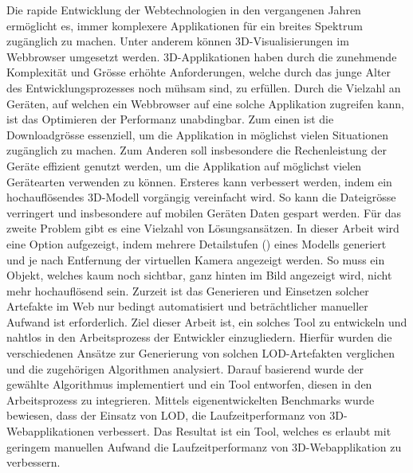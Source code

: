 Die rapide Entwicklung der Webtechnologien in den vergangenen Jahren ermöglicht es, immer komplexere Applikationen für ein breites Spektrum zugänglich zu machen. Unter anderem können 3D-Visualisierungen im Webbrowser umgesetzt werden.
3D-Applikationen haben durch die zunehmende Komplexität und Grösse erhöhte Anforderungen, welche durch das junge Alter des Entwicklungsprozesses noch mühsam sind, zu erfüllen.
Durch die Vielzahl an Geräten, auf welchen ein Webbrowser auf eine solche Applikation zugreifen kann, ist das Optimieren der Performanz unabdingbar.
Zum einen ist die Downloadgrösse essenziell, um die Applikation in möglichst vielen Situationen zugänglich zu machen. Zum Anderen soll insbesondere die Rechenleistung der Geräte effizient genutzt werden, um die Applikation auf möglichst vielen Gerätearten verwenden zu können.
Ersteres kann verbessert werden, indem ein hochauflösendes 3D-Modell vorgängig vereinfacht wird. So kann die Dateigrösse verringert und insbesondere auf mobilen Geräten Daten gespart werden.
Für das zweite Problem gibt es eine Vielzahl von Lösungsansätzen. In dieser Arbeit wird eine Option aufgezeigt, indem mehrere Detailstufen () eines Modells generiert und je nach Entfernung der virtuellen Kamera angezeigt werden. So muss ein Objekt, welches kaum noch sichtbar, ganz hinten im Bild angezeigt wird, nicht mehr hochauflösend sein.
Zurzeit ist das Generieren und Einsetzen solcher Artefakte im Web nur bedingt automatisiert und beträchtlicher manueller Aufwand ist erforderlich.
Ziel dieser Arbeit ist, ein solches Tool zu entwickeln und nahtlos in den Arbeitsprozess der Entwickler einzugliedern.
\bigbreak
Hierfür wurden die verschiedenen Ansätze zur Generierung von solchen LOD-Artefakten verglichen und die zugehörigen Algorithmen analysiert.
Darauf basierend wurde der gewählte Algorithmus implementiert und ein Tool entworfen, diesen in den Arbeitsprozess zu integrieren.
Mittels eigenentwickelten Benchmarks wurde bewiesen, dass der Einsatz von LOD, die Laufzeitperformanz von 3D-Webapplikationen verbessert.
\bigbreak
Das Resultat ist ein Tool, welches es erlaubt mit geringem manuellen Aufwand die Laufzeitperformanz von 3D-Webapplikation zu verbessern.
